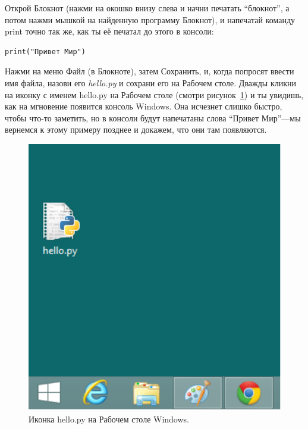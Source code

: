 \begin{WINDOWS}
Открой Блокнот (нажми на окошко внизу слева и начни печатать ``блокнот'', а потом нажми мышкой на найденную программу Блокнот), и напечатай команду print точно так же, как ты её печатал до этого в консоли:

\begin{listing}
\begin{verbatim}
print("Привет Мир")
\end{verbatim}
\end{listing}
Нажми на меню Файл (в Блокноте), затем Сохранить, и, когда попросят ввести имя файла, назови его \emph{hello.py} и сохрани его на Рабочем столе.  Дважды кликни на иконку с именем hello.py на Рабочем столе (смотри рисунок~\ref{fig5}) и ты увидишь, как на мгновение появится консоль Windows.  Она исчезнет слишко быстро, чтобы что-то заметить, но в консоли будут напечатаны слова ``Привет Мир''---мы вернемся к этому примеру позднее и докажем, что они там появляются.\\

\begin{figure}
\begin{center}
\includegraphics{figure5.eps}
\end{center}
\caption{Иконка hello.py на Рабочем столе Windows.}\label{fig5}
\end{figure}
\end{WINDOWS}

